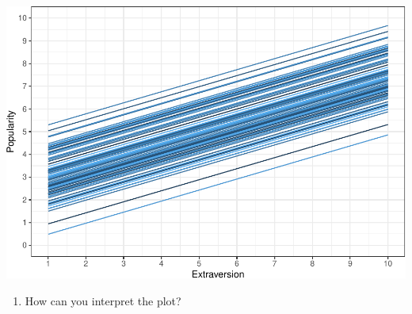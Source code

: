 \documentclass[
]{book}
\providecommand{\tightlist}{%
  \setlength{\itemsep}{0pt}\setlength{\parskip}{0pt}}
\begin{document}
\includegraphics{PSY202B-Modeling-I.Heo_files/figure-latex/unnamed-chunk-9-1.pdf}

\begin{enumerate}
\def\labelenumi{\arabic{enumi}.}
\setcounter{enumi}{1}
\tightlist
\item
  How can you interpret the plot?
\end{enumerate}

  
\end{document}
